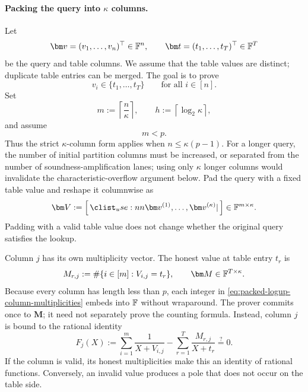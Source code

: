 \documentclass[runningheads]{llncs}
\begin{document}
\paragraph{Packing the query into \(\kappa\) columns.}
Let
\[
    \bm v=(v_1,\ldots,v_n)^\top\in\Field^n,
    \qquad
    \bm t=(t_1,\ldots,t_T)^\top\in\Field^T
\]
be the query and table columns.  We assume that the table values are
distinct; duplicate table entries can be merged.  The goal is to prove
\[
    v_i\in\{t_1,\ldots,t_T\}
    \qquad\text{for all }i\in[n].
\]
Set
\[
    m:=\left\lceil\frac n\kappa\right\rceil,
    \qquad
    h:=\left\lceil\log_2\kappa\right\rceil,
\]
and assume
\begin{equation}
    m<p.
\label{eq:packed-logup-short-column-condition}
\end{equation}
Thus the strict \(\kappa\)-column form applies when
\(n\leq\kappa(p-1)\).  For a longer query, the number of initial
partition columns must be increased, or separated from the number of
soundness-amplification lanes; using only \(\kappa\) longer columns
would invalidate the characteristic-overflow argument below.
Pad the query with a fixed table value and reshape it columnwise as
\begin{equation}
    \bm V
      :=\concat{\bm v^{(1)},\ldots,\bm v^{(\kappa)}}
      \in\Field^{m\times\kappa}.
\label{eq:packed-logup-query-matrix}
\end{equation}
Padding with a valid table value does not change whether the original
query satisfies the lookup.

Column \(j\) has its own multiplicity vector.  The honest value at table
entry \(t_r\) is
\begin{equation}
    M_{r,j}
      :=\#\{i\in[m]:V_{i,j}=t_r\},
    \qquad
    \bm M\in\Field^{T\times\kappa}.
\label{eq:packed-logup-column-multiplicities}
\end{equation}
Because every column has length less than \(p\), each integer in
\eqref{eq:packed-logup-column-multiplicities} embeds into \({\mathbb{F}}\)
without wraparound.  The prover commits once to \(\bm M\); it need not
separately prove the counting formula.  Instead, column \(j\) is bound
to the rational identity
\begin{equation}
    F_j(X)
      :=
      \sum_{i=1}^{m}\frac{1}{X+V_{i,j}}
      -
      \sum_{r=1}^{T}\frac{M_{r,j}}{X+t_r}
      \stackrel{?}{=}0.
\label{eq:packed-logup-column-identity}
\end{equation}
If the column is valid, its honest multiplicities make this an identity
of rational functions.  Conversely, an invalid value produces a pole
that does not occur on the table side.
\end{document}
